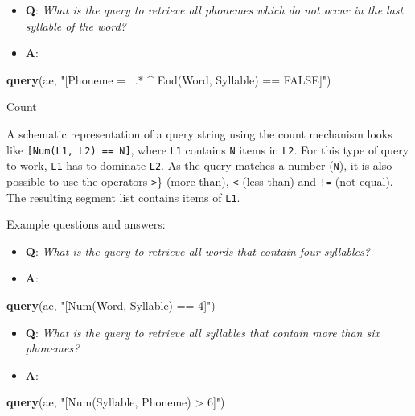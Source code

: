 \documentclass[]{book}
\newenvironment{Shaded}{\begin{snugshade}}{\end{snugshade}}
\newcommand{\KeywordTok}[1]{\textcolor[rgb]{0.13,0.29,0.53}{\textbf{#1}}}
\newcommand{\NormalTok}[1]{#1}
\newcommand{\StringTok}[1]{\textcolor[rgb]{0.31,0.60,0.02}{#1}}
\providecommand{\tightlist}{%
  \setlength{\itemsep}{0pt}\setlength{\parskip}{0pt}}
\begin{document}
\begin{itemize}
\tightlist
\item
  \textbf{Q}: \emph{What is the query to retrieve all phonemes which do not occur in the last syllable of the word?}
\item
  \textbf{A}:
\end{itemize}

\begin{Shaded}
\begin{Highlighting}[]
\KeywordTok{query}\NormalTok{(ae, }\StringTok{"[Phoneme =~ .* ^ End(Word, Syllable) == FALSE]"}\NormalTok{)}
\end{Highlighting}
\end{Shaded}

Count

A schematic representation of a query string using the count mechanism looks like \texttt{{[}Num(L1,\ L2)\ ==\ N{]}}, where \texttt{L1} contains \texttt{N} items in \texttt{L2}. For this type of query to work, \texttt{L1} has to dominate \texttt{L2}. As the query matches a number (\texttt{N}), it is also possible to use the operators \texttt{\textgreater{}}\} (more than), \texttt{\textless{}} (less than) and \texttt{!=} (not equal). The resulting segment list contains items of \texttt{L1}.

Example questions and answers:

\begin{itemize}
\tightlist
\item
  \textbf{Q}: \emph{What is the query to retrieve all words that contain four syllables?}
\item
  \textbf{A}:
\end{itemize}

\begin{Shaded}
\begin{Highlighting}[]
\KeywordTok{query}\NormalTok{(ae, }\StringTok{"[Num(Word, Syllable) == 4]"}\NormalTok{)}
\end{Highlighting}
\end{Shaded}

\begin{itemize}
\tightlist
\item
  \textbf{Q}: \emph{What is the query to retrieve all syllables that contain more than six phonemes?}
\item
  \textbf{A}:
\end{itemize}

\begin{Shaded}
\begin{Highlighting}[]
\KeywordTok{query}\NormalTok{(ae, }\StringTok{"[Num(Syllable, Phoneme) > 6]"}\NormalTok{)}
\end{Highlighting}
\end{Shaded}
\end{document}
